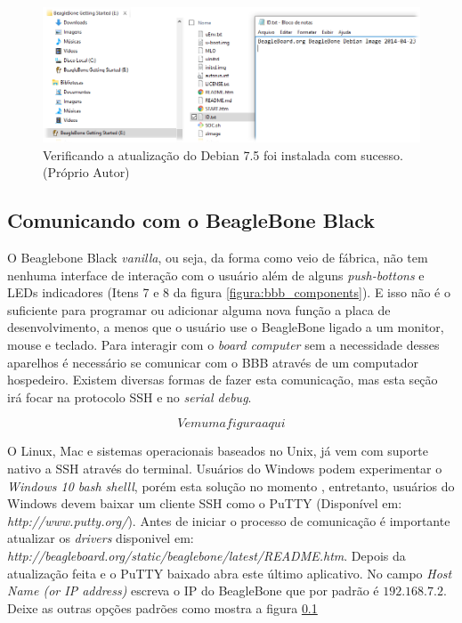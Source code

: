 \begin{figure}[h]
	\centering
	\includegraphics[width=\textwidth]{figuras/check_bbb_version.png}
	\caption{Verificando a atualização do Debian 7.5 foi instalada com sucesso. (Próprio Autor)}
	\label{figura:check_bbb_version}
\end{figure}

\subsection{Comunicando com o BeagleBone Black}

O Beaglebone Black \emph{vanilla}, ou seja, da forma como veio de fábrica, não tem nenhuma interface de interação com o usuário além de alguns \emph{push-bottons} e LEDs indicadores (Itens 7 e 8 da figura \ref{figura:bbb_components}). E isso não é o suficiente para programar ou adicionar alguma nova função a placa de desenvolvimento, a menos que o usuário use o BeagleBone ligado a um monitor, mouse e teclado. Para interagir com o \emph{board computer} sem a necessidade desses aparelhos é necessário se comunicar com o BBB através de um computador hospedeiro. Existem diversas formas de fazer esta comunicação, mas esta seção irá focar na protocolo SSH e no \emph{serial debug}.

$$Vem uma figura aqui$$

O Linux, Mac e sistemas operacionais baseados no Unix, já vem com suporte nativo a SSH através do terminal. Usuários do Windows podem experimentar o \emph{Windows 10 bash shelll}, porém esta solução no momento  , entretanto, usuários do Windows devem baixar um cliente SSH como o PuTTY (Disponível em: \emph{http://www.putty.org/}). Antes de iniciar o processo de comunicação é importante atualizar os \emph{drivers} disponivel em: \emph{http://beagleboard.org/static/beaglebone/latest/README.htm}. Depois da atualização feita e o PuTTY baixado abra este último aplicativo. No campo \emph{Host Name (or IP address)} escreva o IP do BeagleBone que por padrão é $192.168.7.2$. Deixe as outras opções padrões como mostra a figura \ref{}


